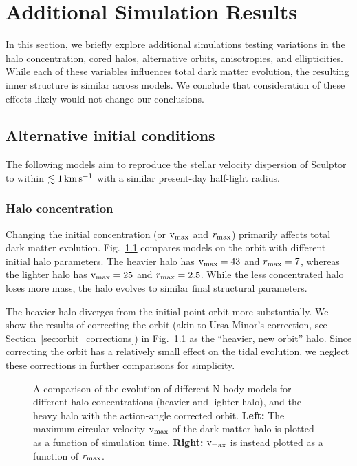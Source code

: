 \chapter{Additional Simulation Results}\label{sec:extra_results}

In this section, we briefly explore additional simulations testing
variations in the halo concentration, cored halos, alternative orbits,
anisotropies, and ellipticities. While each of these variables
influences total dark matter evolution, the resulting inner structure is
similar across models. We conclude that consideration of these effects
likely would not change our conclusions.

\section{Alternative initial
conditions}\label{alternative-initial-conditions}

The following models aim to reproduce the stellar velocity dispersion of
Sculptor to within \(\lesssim 1\,{\rm km\,s^{-1}}\) with a similar present-day
half-light radius.

\subsection{Halo concentration}\label{halo-concentration}

Changing the initial concentration (or \({\rm v}_{\rm max}\) and \(r_{\rm max}\))
primarily affects total dark matter evolution.
Fig.~\ref{fig:tidal_tracks_concentration} compares models on the
\smallperi{} orbit with different initial halo parameters. The heavier
halo has \({\rm v}_{\rm max}=43\) and \(r_{\rm max}=7\), whereas the lighter halo has
\({\rm v}_{\rm max}=25\) and \(r_{\rm max}=2.5\). While the less concentrated halo loses
more mass, the halo evolves to similar final structural parameters.

The heavier halo diverges from the initial point orbit more
substantially. We show the results of correcting the orbit (akin to Ursa
Minor's correction, see Section~\ref{sec:orbit_corrections}) in
Fig.~\ref{fig:tidal_tracks_concentration} as the ``heavier, new orbit''
halo. Since correcting the orbit has a relatively small effect on the
tidal evolution, we neglect these corrections in further comparisons for
simplicity.

\begin{figure}
\centering
{}
\caption[Tidal dependence on halo concentration]{A comparison of the
evolution of different N-body models for different halo concentrations
(heavier and lighter halo), and the heavy halo with the action-angle
corrected orbit. \textbf{Left:} The maximum circular velocity \({\rm v}_{\rm max}\)
of the dark matter halo is plotted as a function of simulation time.
\textbf{Right:} \({\rm v}_{\rm max}\) is instead plotted as a function of
\(r_{\rm max}\).}\label{fig:tidal_tracks_concentration}
\end{figure}

